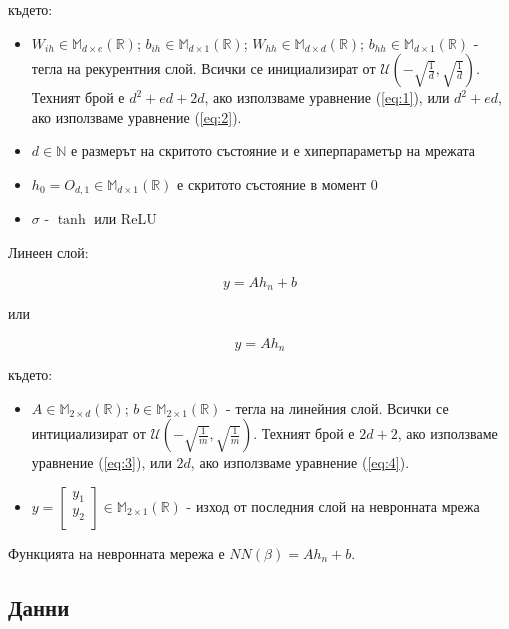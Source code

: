 \documentclass[a4paper,12pt]{article}
\begin{document}
където:

\begin{itemize}
\item $W_{ih} \in \mathbb{M}_{d \times e} (\mathbb{R})$; $b_{ih} \in \mathbb{M}_{d \times 1} (\mathbb{R})$; $W_{hh} \in \mathbb{M}_{d \times d} (\mathbb{R})$; $b_{hh} \in \mathbb{M}_{d \times 1} (\mathbb{R})$ - тегла на рекурентния слой. Всички се инициализират от $\mathcal{U}(-\sqrt{\frac{1}{d}}, \sqrt{\frac{1}{d}})$. Техният брой е $d^2 + ed + 2d$, ако използваме уравнение (\ref{eq:1}), или $d^2 + ed$, ако използваме уравнение (\ref{eq:2}).
\item $d \in \mathbb{N}$ е размерът на скритото състояние и е хиперпараметър на мрежата
\item $h_0 = O_{d, 1} \in \mathbb{M}_{d \times 1} (\mathbb{R})$ е скритото състояние в момент 0
\item $\sigma$ - $\tanh$ или ReLU
\end{itemize}

Линеен слой:

\begin{equation} \label{eq:3}
y = A h_n + b
\end{equation}

или

\begin{equation} \label{eq:4}
y = A h_n
\end{equation}

където:

\begin{itemize}
\item $ A \in \mathbb{M}_{2 \times d} (\mathbb{R})$; $b \in \mathbb{M}_{2 \times 1} (\mathbb{R}) $ - тегла на линейния слой. Всички се интициализират от $\mathcal{U}(-\sqrt{\frac{1}{m}}, \sqrt{\frac{1}{m}})$. Техният брой е $2d + 2$, ако използваме уравнение (\ref{eq:3}), или $2d$, ако използваме уравнение (\ref{eq:4}).
\item $y = \begin{bmatrix}
  y_1 \\ 
  y_2 \\ 
\end{bmatrix} \in \mathbb{M}_{2 \times 1} (\mathbb{R})$ - изход от последния слой на невронната мрежа
\end{itemize}

Функцията на невронната мережа е $NN(\beta) = Ah_n + b$.

\subsection{Данни}
\end{document}
